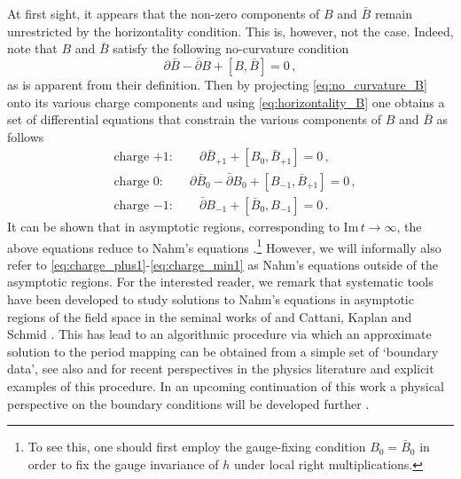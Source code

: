 \documentclass[11pt,a4paper]{article}
\numberwithin{equation}{section}
\numberwithin{table}{section}\setlength{\multlinegap}{25pt}
\begin{document}
At first sight, it appears that the non-zero components of $B$ and $\bar{B}$ remain unrestricted by the horizontality condition. This is, however, not the case. Indeed, note that $B$ and $\bar{B}$ satisfy the following no-curvature condition
\begin{equation}\label{eq:no_curvature_B}
	\partial\bar{B} - \bar{\partial}B+[B,\bar{B}]=0\,,
\end{equation}
as is apparent from their definition. Then by projecting \eqref{eq:no_curvature_B} onto its various charge components and using \eqref{eq:horizontality_B} one obtains a set of differential equations that constrain the various components of $B$ and $\bar{B}$ as follows
\begin{align}
\label{eq:charge_plus1}	&\text{charge $+1$}:\qquad \partial\bar{B}_{+1}+[B_0,\bar{B}_{+1}] = 0\,,\\
\label{eq:charge_0}	&\text{charge $0$}:\qquad \partial\bar{B}_0-\bar{\partial}B_0 +[B_{-1},\bar{B}_{+1}] = 0\,,\\
\label{eq:charge_min1}	&\text{charge $-1$}:\qquad \bar{\partial}B_{-1}+[\bar{B}_{0},B_{-1}] = 0\,.
\end{align}
It can be shown that in asymptotic regions, corresponding to $\mathrm{Im}\,t\rightarrow \infty$, the above equations reduce to Nahm's equations \cite{schmid}.\footnote{To see this, one should first employ the gauge-fixing condition $B_0=\bar{B}_0$ in order to fix the gauge invariance of $h$ under local right multiplications.} However, we will informally also refer to \eqref{eq:charge_plus1}-\eqref{eq:charge_min1} as Nahm's equations outside of the asymptotic regions. For the interested reader, we remark that systematic tools have been developed to study solutions to Nahm's equations in asymptotic regions of the field space in the seminal works of \cite{schmid} and Cattani, Kaplan and Schmid \cite{CKS}. This has lead to an algorithmic procedure via which an approximate solution to the period mapping can be obtained from a simple set of `boundary data', see also \cite{Grimm:2020cda} and \cite{Grimm:2021ikg} for recent perspectives in the physics literature and explicit examples of this procedure. In an upcoming continuation of this work a physical perspective on the boundary conditions will be developed further \cite{Grimm_WZW_II}.
\end{document}
